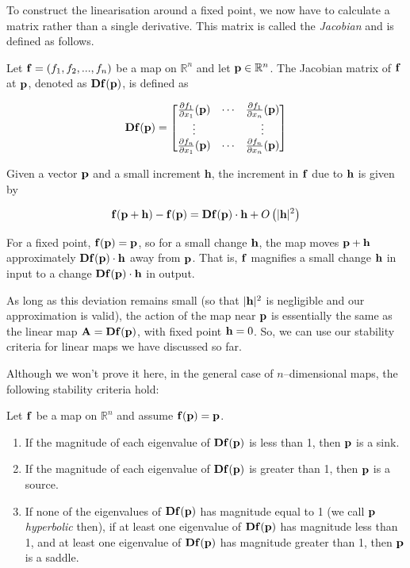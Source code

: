 To construct the linearisation around a fixed point, we now have to calculate a matrix rather than a single derivative. This matrix is called the \emph{Jacobian} and is defined as follows.

Let ${\bf f}=(f_1,f_2, ... ,f_n)$ be a map on $\mathbb{R}^n$ and let ${\bf p} \in \mathbb{R}^n$. The Jacobian matrix of ${\bf f}$ at ${\bf p}$, denoted as ${\bf Df}({\bf p})$, is defined as

\begin{equation}
{\bf Df}({\bf p})=
\begin{bmatrix}
\frac{\partial f_1}{\partial x_1}({\bf p}) & \cdots & \frac{\partial f_1}{\partial x_n}({\bf p}) \\
\vdots & & \vdots \\
\frac{\partial f_n}{\partial x_1}({\bf p}) & \cdots & \frac{\partial f_n}{\partial x_n}({\bf p}) \\
\end{bmatrix} 
\end{equation} 

Given a vector ${\bf p}$ and a small increment {\bf h}, the increment in ${\bf f}$ due to ${\bf h}$ is given by

\begin{equation}
{\bf f}({\bf p} + {\bf h}) - {\bf f}({\bf p}) = {\bf Df}({\bf p}) \cdot {\bf h} + O\left(|{\bf h}|^2\right)
\end{equation} 

For a fixed point, ${\bf f}({\bf p}) = {\bf p}$, so for a small change ${\bf h}$, the map moves ${\bf p} + {\bf h}$ approximately ${\bf Df}({\bf p}) \cdot {\bf h}$ away from ${\bf p}$. That is, ${\bf f}$ magnifies a small change ${\bf h}$ in input to a change ${\bf Df}({\bf p}) \cdot {\bf h}$ in output.

As long as this deviation remains small (so that $|{\bf h}|^2$ is negligible and our approximation is valid), the action of the map near ${\bf p}$ is essentially the same as the linear map ${\bf A} = {\bf Df}({\bf p})$, with fixed point ${\bf h} = 0$. So, we can use our stability criteria for linear maps we have discussed so far.

Although we won't prove it here, in the general case of $n$--dimensional maps, the following stability criteria hold:

Let ${\bf f}$ be a map on $\mathbb{R}^n$ and assume ${\bf f}({\bf p})={\bf p}$.

\begin{enumerate}
\item
If the magnitude of each eigenvalue of ${\bf Df}({\bf p})$ is less than 1, then ${\bf p}$ is a sink.
\item
If the magnitude of each eigenvalue of ${\bf Df}({\bf p})$ is greater than 1, then ${\bf p}$ is a source.
\item
If none of the eigenvalues of ${\bf Df}({\bf p})$ has magnitude equal to 1 (we call ${\bf p}$ \emph{hyperbolic} then), if at least one eigenvalue of ${\bf Df}({\bf p})$ has magnitude less than 1, and at least one eigenvalue of ${\bf Df}({\bf p})$ has magnitude greater than 1, then ${\bf p}$ is a saddle.
\end{enumerate}

